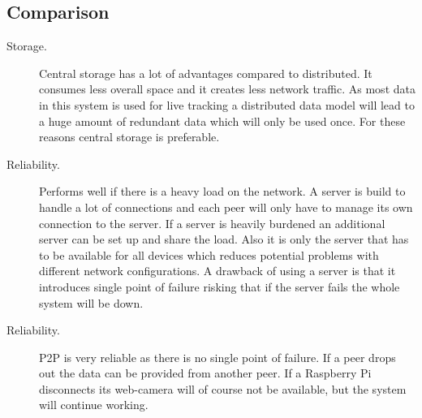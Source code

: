 \subsection{Comparison}
\begin{description}
\item[Storage.] Central storage has a lot of advantages compared to distributed. It consumes less overall space and it creates less network traffic. As most data in this system is used for live tracking a distributed data model will lead to a huge amount of redundant data which will only be used once. For these reasons central storage is preferable.

\item[Reliability.] Performs well if there is a heavy load on the network. A server is build to handle a lot of connections and each peer will only have to manage its own connection to the server. If a server is heavily burdened an additional server can be set up and share the load. Also it is only the server that has to be available for all devices which reduces potential problems with different network configurations. A drawback of using a server is that it introduces single point of failure risking that if the server fails the whole system will be down.

\item[Reliability.] P2P is very reliable as there is no single point of failure. If a peer drops out the data can be provided from another peer. If a Raspberry Pi disconnects its web-camera will of course not be available, but the system will continue working.
\end{description}